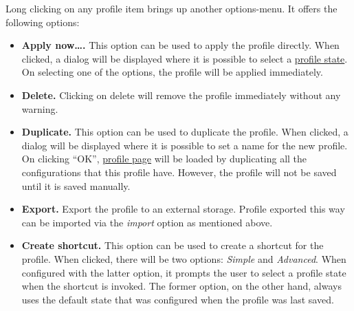 Long clicking on any profile item brings up another options-menu. It offers the following options:
\begin{itemize}
    \item \textbf{Apply now\dots.} This option can be used to apply the profile directly. When clicked, a dialog will be
    displayed where it is possible to select a \hyperref[subsubsec:profile-state]{profile state}.
    On selecting one of the options, the profile will be applied immediately.

    \item \textbf{Delete.} Clicking on delete will remove the profile immediately without any warning.

    \item \textbf{Duplicate.} This option can be used to duplicate the profile. When clicked, a dialog will be
    displayed where it is possible to set a name for the new profile. On clicking ``OK'', \hyperref[sec:profile-page]{profile page}
    will be loaded by duplicating all the configurations that this profile have. However, the profile will not be saved
    until it is saved manually.

    \item \textbf{Export.} Export the profile to an external storage. Profile exported this way can be imported via
    the \textit{import} option as mentioned above.

    \item \textbf{Create shortcut.} This option can be used to create a shortcut for the profile. When clicked, there
    will be two options: \textit{Simple} and \textit{Advanced}. When configured with the latter option, it prompts the
    user to select a profile state when the shortcut is invoked. The former option, on the other hand, always uses the
    default state that was configured when the profile was last saved.
\end{itemize}
